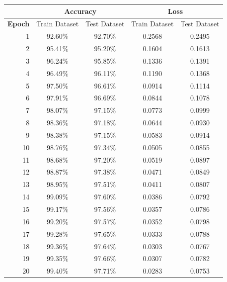 \documentclass[10pt,a4paper,fullpage]{article}
\begin{document}
\hfill \break
\vspace{-0.5cm}
\begin{center}
	\begin{tabular}{ r | c | c | c | c }
		\hline
		\multicolumn{1}{c|}{} & \multicolumn{2}{c|}{\textbf{Accuracy}} & \multicolumn{2}{c}{\textbf{Loss}}\\
		\hline
		\textbf{Epoch} & Train Dataset & Test Dataset & Train Dataset & Test Dataset\\
		\hline
		1 & 92.60\% & 92.70\% & 0.2568 & 0.2495 \\
		2 & 95.41\% & 95.20\% & 0.1604 & 0.1613 \\
		3 & 96.24\% & 95.85\% & 0.1336 & 0.1391 \\
		4 & 96.49\% & 96.11\% & 0.1190 & 0.1368 \\
		5 & 97.50\% & 96.61\% & 0.0914 & 0.1114 \\
		6 & 97.91\% & 96.69\% & 0.0844 & 0.1078 \\
		7 & 98.07\% & 97.15\% & 0.0773 & 0.0999 \\
		8 & 98.36\% & 97.18\% & 0.0644 & 0.0930 \\
		9 & 98.38\% & 97.15\% & 0.0583 & 0.0914 \\
		10 & 98.76\% & 97.34\% & 0.0505 & 0.0855 \\
		11 & 98.68\% & 97.20\% & 0.0519 & 0.0897 \\
		12 & 98.87\% & 97.38\% & 0.0471 & 0.0849 \\
		13 & 98.95\% & 97.51\% & 0.0411 & 0.0807 \\
		14 & 99.09\% & 97.60\% & 0.0386 & 0.0792 \\
		15 & 99.17\% & 97.56\% & 0.0357 & 0.0786 \\
		16 & 99.20\% & 97.57\% & 0.0352 & 0.0798 \\
		17 & 99.28\% & 97.65\% & 0.0333 & 0.0788 \\
		18 & 99.36\% & 97.64\% & 0.0303 & 0.0767 \\
		19 & 99.35\% & 97.66\% & 0.0307 & 0.0782 \\
		20 & 99.40\% & 97.71\% & 0.0283 & 0.0753 \\
		\hline
	\end{tabular}
\end{center}
\end{document}
